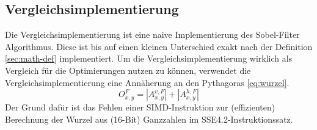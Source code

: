 \documentclass[course=erap]{aspdoc}
\begin{document}
\subsection{Vergleichsimplementierung}
\label{sec:vergleichsimplementierung}
Die Vergleichsimplementierung ist eine naive Implementierung des Sobel-Filter Algorithmus.
Diese ist bis auf einen kleinen Unterschied exakt nach der Definition \ref{sec:math-def} implementiert.
Um die Vergleichsimplementierung wirklich als Vergleich für die Optimierungen nutzen zu können, verwendet die Vergleichsimplementierung eine Annäherung an den Pythagoras \ref{eq:wurzel}.
\begin{equation}
    O^{F}_{x,y} = \left | A^{v,F}_{x,y} \right | + \left | A^{h,F}_{x,y} \right |
    \label{eq:betrag}
\end{equation}
Der Grund dafür ist das Fehlen einer SIMD-Instruktion zur (effizienten) Berechnung der Wurzel aus (16-Bit) Ganzzahlen im SSE4.2-Instruktionssatz.
\end{document}
